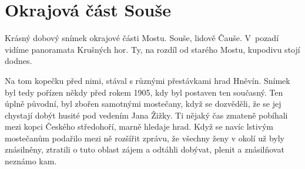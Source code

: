 
\chapter{Okrajová část Souše}

Krásný dobový snímek okrajové části Mostu. Souše, lidově Čauše. V~pozadí vidíme
panoramata Krušných hor. Ty, na rozdíl od starého Mostu, kupodivu stojí dodnes.

Na tom kopečku před nimi, stával s různými přestávkami hrad Hněvín.
Snímek byl tedy pořízen někdy před rokem 1905, kdy byl postaven ten
současný. Ten úplně původní, byl zbořen samotnými mostečany, když se
dozvěděli, že se jej chystají dobýt husité pod vedením Jana Žižky. Ti
nějaký čas zmateně pobíhali mezi kopci Českého středohoří, marně
hledaje hrad. Když se navíc lstivým mostečanům podařilo mezi ně
rozšířit zprávu, že všechny ženy v okolí už byly znásilněny, ztratili
o tuto oblast zájem a odtáhli dobývat, plenit a znásilňovat neznámo
kam.
